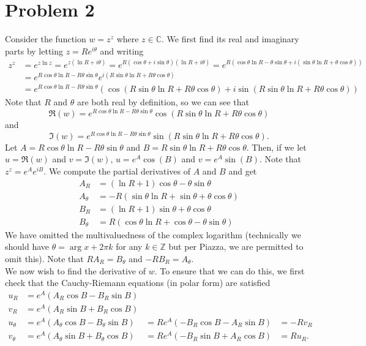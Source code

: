 \documentclass{article}
\begin{document}
\section{Problem 2} 
Consider the function $w=z^z$ where $z\in\mathbb{C}$. We first find its real and imaginary parts by letting $z=Re^{i\theta}$ and writing
\[
\begin{split}
z^z&=e^{z\ln z}= e^{z(\ln R+i\theta)}=e^{R(\cos\theta+i\sin\theta)(\ln R+i\theta)}=e^{R(\cos\theta\ln R-\theta\sin\theta+i(\sin\theta\ln R+\theta\cos\theta))} \\&=
e^{R\cos\theta\ln R-R\theta\sin\theta}e^{i(R\sin\theta\ln R+R\theta\cos\theta)}\\&=
e^{R\cos\theta\ln R-R\theta\sin\theta}(\cos(R\sin\theta\ln R+R\theta\cos\theta)+i\sin(R\sin\theta\ln R+R\theta\cos\theta))
\end{split}
\]
Note that $R$ and $\theta$ are both real by definition, so we can see that 
\[
\Re(w)=e^{R\cos\theta\ln R-R\theta\sin\theta}\cos(R\sin\theta\ln R+R\theta\cos\theta)
\]
and 
\[
\Im(w)=e^{R\cos\theta\ln R-R\theta\sin\theta}\sin(R\sin\theta\ln R+R\theta\cos\theta).
\]
Let $A=R\cos\theta\ln R-R\theta\sin\theta$ and $B=R\sin\theta\ln R+R\theta\cos\theta$. Then, if we let $u=\Re(w)$ and $v=\Im(w)$, $u=e^A\cos(B)$ and $v=e^A\sin(B)$. Note that $z^z=e^Ae^{iB}$. We compute the partial derivatives of $A$ and $B$ and get
\begin{align*}
A_R&=(\ln R+1)\cos\theta-\theta\sin\theta\\
A_\theta&=-R(\sin\theta\ln R+\sin\theta+\theta\cos\theta)\\
B_R&=(\ln R+1)\sin\theta+\theta\cos\theta\\
B_\theta&=R(\cos\theta\ln R+\cos\theta-\theta\sin\theta)
\end{align*}
We have omitted the multivaluedness of the complex logarithm (technically we should have $\theta=\arg x+2\pi k$ for any $k\in\mathbb{Z}$ but per Piazza, we are permitted to omit this).
Note that $RA_R=B_\theta$ and $-RB_R=A_\theta$.\\
We now wish to find the derivative of $w$. To ensure that we can do this, we first check that the Cauchy-Riemann equations (in polar form) are satisfied
\begin{align*}
u_R&=e^A(A_R\cos B-B_R\sin B)\\
v_R&=e^A(A_R\sin B+B_R\cos B)\\
u_\theta&=e^A(A_\theta\cos B-B_\theta\sin B)&=Re^A(-B_R\cos B-A_R \sin B)&=-Rv_R\\
v_\theta&=e^A(A_\theta\sin B+B_\theta\cos B)&=Re^A(-B_R\sin B+A_R\cos B)&=Ru_R.
\end{align*}
\end{document}
